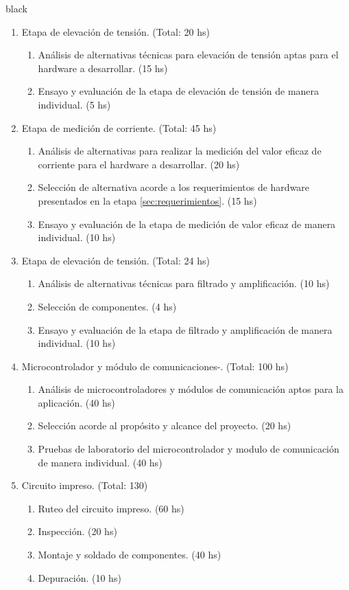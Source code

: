 \documentclass[11pt]{charter}
\begin{document}
\begin{consigna}{black}
\begin{enumerate}
\begin{enumerate}
			 \item Etapa de elevación de tensión. (Total: 20 hs)
			 \begin{enumerate}
			 	\item Análisis de alternativas técnicas para elevación de tensión aptas para el hardware a desarrollar. (15 hs)
			 	\item Ensayo y evaluación de la etapa de elevación de tensión de manera individual. (5 hs)
			 \end{enumerate}

			 \item Etapa de medición de corriente. (Total: 45 hs)
			 \begin{enumerate}
			 	\item Análisis de alternativas para realizar la medición del valor eficaz de corriente para el hardware a desarrollar. (20 hs)
			 	\item Selección de alternativa acorde a los requerimientos de hardware presentados en la etapa \ref{sec:requerimientos}. (15 hs)
			 	\item Ensayo y evaluación de la etapa de medición de valor eficaz de manera individual. (10 hs)
			 \end{enumerate}
			 
			 \item Etapa de elevación de tensión. (Total: 24 hs)
			 \begin{enumerate}
			 	\item Análisis de alternativas técnicas para filtrado y amplificación. (10 hs)
			 	\item Selección de componentes. (4 hs)
			 	\item Ensayo y evaluación de la etapa de filtrado y amplificación de manera individual. (10 hs)
			 \end{enumerate}
			 
			 \item Microcontrolador y módulo de comunicaciones-. (Total: 100 hs)
			 \begin{enumerate}
			 	\item Análisis de microcontroladores y módulos de comunicación aptos para la aplicación. (40 hs)
			 	\item Selección acorde al propósito y alcance del proyecto. (20 hs)
			 	\item Pruebas de laboratorio del microcontrolador y modulo de comunicación de manera individual. (40 hs)
			 \end{enumerate}
			 \item Circuito impreso. (Total: 130)
			 \begin{enumerate}
			 	\item Ruteo del circuito impreso. (60 hs)
			 	\item Inspección. (20 hs)
			 	\item Montaje y soldado de componentes. (40 hs)
			 	\item Depuración. (10 hs)
			 \end{enumerate}			 			 			 
		\end{enumerate}
				

\end{enumerate}
\end{consigna}
\end{document}
